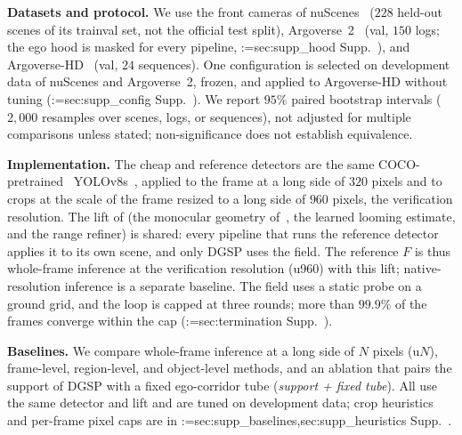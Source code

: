 \documentclass[10pt,twocolumn,letterpaper]{article}
\makeatletter
\newcommand{\method}{DGSP\xspace}
\newcommand{\full}{F}             %
\theoremstyle{definition}
\theoremstyle{remark}
\DeclareRobustCommand{\supp}[1]{\def\supp@list{}\@for\supp@i:=#1\do{\ifx\supp@list\@empty\edef\supp@list{S-\supp@i}\else\edef\supp@list{\supp@list,S-\supp@i}\fi}%
\edef\supp@cmd{\noexpand\Cref*{\supp@list}}Supp.~\supp@cmd}
\makeatother
\begin{document}
\noindent\textbf{Datasets and protocol.}
We use the front cameras of nuScenes~\cite{nuscenes} ($228$ held-out scenes of its trainval set, not the official test split), Argoverse~2~\cite{av2} (val, $150$ logs; the ego hood is masked for every pipeline, \supp{sec:supp_hood}), and Argoverse-HD~\cite{streaming} (val, $24$ sequences).
One configuration is selected on development data of nuScenes and Argoverse~2, frozen, and applied to Argoverse-HD without tuning (\supp{sec:supp_config}).
We report $95\%$ paired bootstrap intervals ($2{,}000$ resamples over scenes, logs, or sequences), not adjusted for multiple comparisons unless stated; non-significance does not establish equivalence.

\noindent\textbf{Implementation.}
The cheap and reference detectors are the same COCO-pretrained~\cite{coco} YOLOv8s~\cite{yolov8}, applied to the frame at a long side of $320$ pixels and to crops at the scale of the frame resized to a long side of $960$ pixels, the verification resolution.
The lift of  (the monocular geometry of~\cite{deep}, the learned looming estimate, and the range refiner) is shared: every pipeline that runs the reference detector applies it to its own scene, and only \method uses the field.
The reference $\full$ is thus whole-frame inference at the verification resolution (u960) with this lift; native-resolution inference is a separate baseline.
The field uses a static probe on a ground grid, and the loop is capped at three rounds; more than $99.9\%$ of the frames converge within the cap (\supp{sec:termination}).

\noindent\textbf{Baselines.}
We compare whole-frame inference at a long side of $N$ pixels (u$N$), frame-level, region-level, and object-level methods, and an ablation that pairs the support of \method with a fixed ego-corridor tube (\emph{support + fixed tube}).
All use the same detector and lift and are tuned on development data; crop heuristics and per-frame pixel caps are in \supp{sec:supp_baselines,sec:supp_heuristics}.
\end{document}
